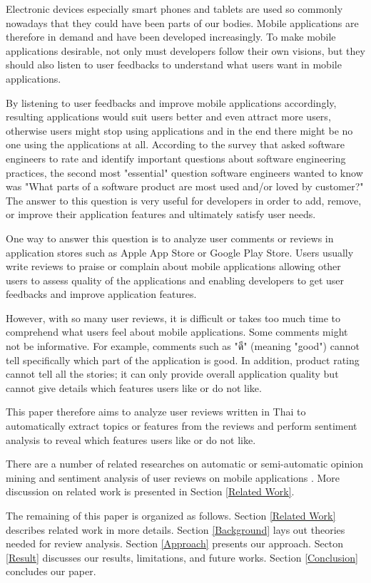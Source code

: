 
Electronic devices especially smart phones and tablets are used so commonly nowadays that they could have been parts of our bodies. Mobile applications are therefore in demand and have been developed increasingly. To make mobile applications desirable, not only must developers follow their own visions, but they should also listen to user feedbacks to understand what users want in mobile applications.

By listening to user feedbacks and improve mobile applications accordingly, resulting applications would suit users better and even attract more users, otherwise users might stop using applications and in the end there might be no one using the applications at all. According to the survey \cite{145Q} that asked software engineers to rate and identify important questions about software engineering practices, the second most "essential" question software engineers wanted to know was "What parts of a software product are most used and/or loved by customer?" The answer to this question is very useful for developers in order to add, remove, or improve their application features and ultimately satisfy user needs.

One way to answer this question is to analyze user comments or reviews in application stores such as Apple App Store or Google Play Store. Users usually write reviews to praise or complain about mobile applications allowing other users to assess quality of the applications and enabling developers to get user feedbacks and improve application features. 

However, with so many user reviews, it is difficult or takes too much time to comprehend what users feel about mobile applications. Some comments might not be informative. For example, comments such as "{ดี}" (meaning "good") cannot tell specifically which part of the application is good. In addition, product rating cannot tell all the stories; it can only provide overall application quality but cannot give details which features users like or do not like.

This paper therefore aims to analyze user reviews written in Thai to automatically extract topics or features from the reviews and perform sentiment analysis to reveal which features users like or do not like. 

There are a number of related researches on automatic or semi-automatic opinion mining and sentiment analysis of user reviews on mobile applications \cite{ar-miner,userslikefeature,keywordmining}. More discussion on related work is presented in Section \ref{Related Work}.

The remaining of this paper is organized as follows. Section \ref{Related Work} describes related work in more details. Section \ref{Background} lays out theories needed for review analysis. Section \ref{Approach} presents our approach. Secton \ref{Result} discusses our results, limitations, and future works. Section \ref{Conclusion} concludes our paper. 
